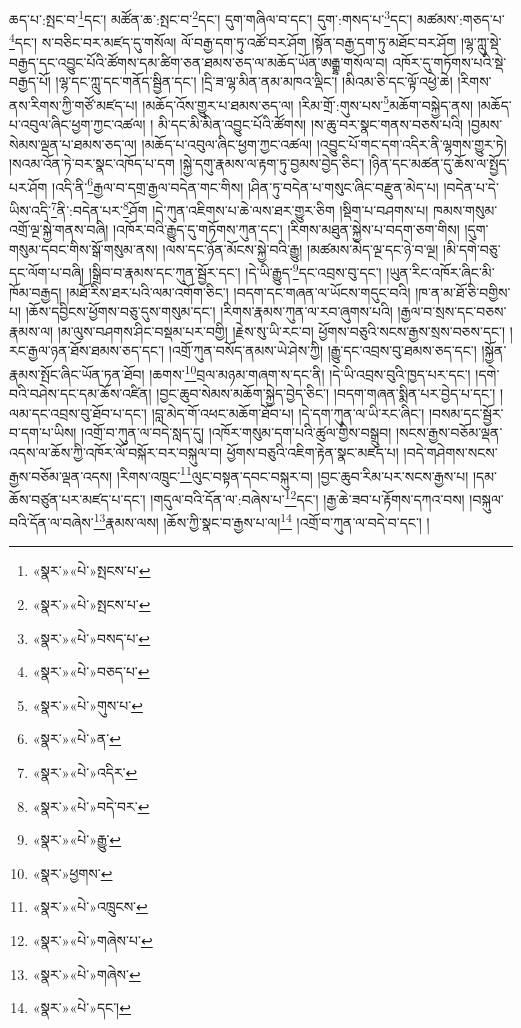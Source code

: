 ཆད་པ་:སྤང་བ་\footnote{«སྣར་»«པེ་»སྤངས་པ་}དང་། མཚོན་ཆ་:སྤང་བ་\footnote{«སྣར་»«པེ་»སྤངས་པ་}དང་། དུག་གཞིལ་བ་དང་། དུག་:གསད་པ་\footnote{«སྣར་»«པེ་»བསད་པ་}དང་། མཚམས་:གཅད་པ་\footnote{«སྣར་»«པེ་»བཅད་པ་}དང་། ས་བཅིང་བར་མཛད་དུ་གསོལ། ལོ་བརྒྱ་དག་ཏུ་འཚོ་བར་ཤོག །སྟོན་བརྒྱ་དག་ཏུ་མཐོང་བར་ཤོག །ལྷ་ཀླུ་སྡེ་བརྒྱད་དང་འབྱུང་པོའི་ཚོགས་དམ་ཚིག་ཅན་ཐམས་ཅད་ལ་མཆོད་ཡོན་ཨརྒྷ་གསོལ་བ། འཁོར་དུ་གཏོགས་པའི་སྡེ་བརྒྱད་པོ། །ལྷ་དང་ཀླུ་དང་གནོད་སྦྱིན་དང་། །དྲི་ཟ་ལྷ་མིན་ནམ་མཁའ་ལྡིང་། །མིའམ་ཅི་དང་ལྟོ་འཕྱེ་ཆེ། །རིགས་ནས་རིགས་ཀྱི་གཙོ་མཛད་པ། །མཆོད་འོས་གྱུར་པ་ཐམས་ཅད་ལ། །རིམ་གྲོ་:གུས་པས་\footnote{«སྣར་»«པེ་»གུས་པ་}མཆོག་བསྐྱེད་ནས། །མཆོད་པ་འབུལ་ཞིང་ཕྱག་ཀྱང་འཚལ། །
མི་དང་མི་མིན་འབྱུང་པོའི་ཚོགས། །ས་ཆུ་བར་སྣང་གནས་བཅས་པའི། །བྱམས་སེམས་ལྡན་པ་ཐམས་ཅད་ལ། །མཆོད་པ་འབུལ་ཞིང་ཕྱག་ཀྱང་འཚལ། །འབྱུང་པོ་གང་དག་འདིར་ནི་ལྷགས་གྱུར་ཏེ། །སའམ་འོན་ཏེ་བར་སྣང་འཁོད་པ་དག །སྐྱེ་དགུ་རྣམས་ལ་རྟག་ཏུ་བྱམས་བྱེད་ཅིང་། །ཉིན་དང་མཚན་དུ་ཆོས་ལ་སྤྱོད་པར་ཤོག །འདི་ནི་\footnote{«སྣར་»«པེ་»ན་}རྒྱལ་བ་དགྲ་རྒྱལ་བདེན་གང་གིས། །ཤིན་ཏུ་བདེན་པ་གསུང་ཞིང་བརྫུན་མེད་པ། །བདེན་པ་དེ་ཡིས་འདི་\footnote{«སྣར་»«པེ་»འདིར་}ནི་:བདེན་པར་\footnote{«སྣར་»«པེ་»བདེ་བར་}ཤོག །དེ་ཀུན་འཇིགས་པ་ཆེ་ལས་ཐར་གྱུར་ཅིག །སྡིག་པ་བཤགས་པ། ཁམས་གསུམ་འགྲོ་ལྔ་སྐྱེ་གནས་བཞི། །འཁོར་བའི་རྒྱུད་དུ་གཏོགས་ཀུན་དང་། །རིགས་མཐུན་སྐྱེས་པ་བདག་ཅག་གིས། །དུག་གསུམ་དབང་གིས་སྒོ་གསུམ་ནས། །ལས་དང་ཉོན་མོངས་སྐྱེ་བའི་རྒྱུ། །མཚམས་མེད་ལྔ་དང་ཉེ་བ་ལྔ། །མི་དགེ་བཅུ་དང་ལོག་པ་བཞི། །སྒྲིབ་བ་རྣམས་དང་ཀུན་སྦྱོར་དང་། །དེ་ཡི་རྒྱུད་\footnote{«སྣར་»«པེ་»རྒྱུ་}དང་འབྲས་བུ་དང་། །ཡུན་རིང་འཁོར་ཞིང་མི་ཁོམ་བརྒྱད། །མཐོ་རིས་ཐར་པའི་ལམ་འགོག་ཅིང་། །བདག་དང་གཞན་ལ་ཡོངས་གདུང་བའི། །ཁ་ན་མ་ཐོ་ཅི་བགྱིས་པ། །ཆོས་དབྱིངས་ཕྱོགས་བཅུ་དུས་གསུམ་དང་། །རིགས་རྣམས་ཀུན་ལ་རབ་ཞུགས་པའི། །རྒྱལ་བ་སྲས་དང་བཅས་རྣམས་ལ། །མ་ལུས་བཤགས་ཤིང་བསྡམ་པར་བགྱི། །རྗེས་སུ་ཡི་རང་བ། ཕྱོགས་བཅུའི་སངས་རྒྱས་སྲས་བཅས་དང་། །རང་རྒྱལ་ཉན་ཐོས་ཐམས་ཅད་དང་། །འགྲོ་ཀུན་བསོད་ནམས་ཡེ་ཤེས་ཀྱི། །རྒྱུ་དང་འབྲས་བུ་ཐམས་ཅད་དང་། །སྐྱོན་རྣམས་སྤོང་ཞིང་ཡོན་ཏན་ཐོབ། །ཆགས་\footnote{«སྣར་»ཕྱགས་}བྲལ་མཉམ་གཞག་ས་དང་ནི། །དེ་ཡི་འབྲས་བུའི་ཁྱད་པར་དང་། །དགེ་བའི་བཤེས་དང་དམ་ཆོས་འཛིན། །བྱང་ཆུབ་སེམས་མཆོག་སྐྱེད་བྱེད་ཅིང་། །བདག་གཞན་སྨིན་པར་བྱེད་པ་དང་། །ལམ་དང་འབྲས་བུ་ཐོབ་པ་དང་། །བླ་མེད་གོ་འཕང་མཆོག་ཐོབ་པ། །དེ་དག་ཀུན་ལ་ཡི་རང་ཞིང་། །བསམ་དང་སྦྱོར་བ་དག་པ་ཡིས། །འགྲོ་བ་ཀུན་ལ་བདེ་སླད་དུ། །འཁོར་གསུམ་དག་པའི་ཚུལ་གྱིས་བསྒྲུབ། །སངས་རྒྱས་བཅོམ་ལྡན་འདས་ལ་ཆོས་ཀྱི་འཁོར་ལོ་བསྐོར་བར་བསྐུལ་བ། ཕྱོགས་བཅུའི་འཇིག་རྟེན་སྣང་མཛད་པ། །བདེ་གཤེགས་སངས་རྒྱས་བཅོམ་ལྡན་འདས། །རིགས་འཁྲུང་\footnote{«སྣར་»«པེ་»འཁྲུངས་}ལུང་བསྟན་དབང་བསྐུར་བ། །བྱང་ཆུབ་རིམ་པར་སངས་རྒྱས་པ། །དམ་ཆོས་བཙུན་པར་མཛད་པ་དང་། །གདུལ་བའི་དོན་ལ་:བཞེས་པ་\footnote{«སྣར་»«པེ་»གཞེས་པ་}དང་། །རྒྱ་ཆེ་ཟབ་པ་རྟོགས་དཀའ་བས། །བསྐུལ་བའི་དོན་ལ་བཞེས་\footnote{«སྣར་»«པེ་»གཞེས་}རྣམས་ལས། །ཆོས་ཀྱི་སྣང་བ་རྒྱས་པ་ལ།\footnote{«སྣར་»«པེ་»དང་།} །འགྲོ་བ་ཀུན་ལ་བདེ་བ་དང་། །
